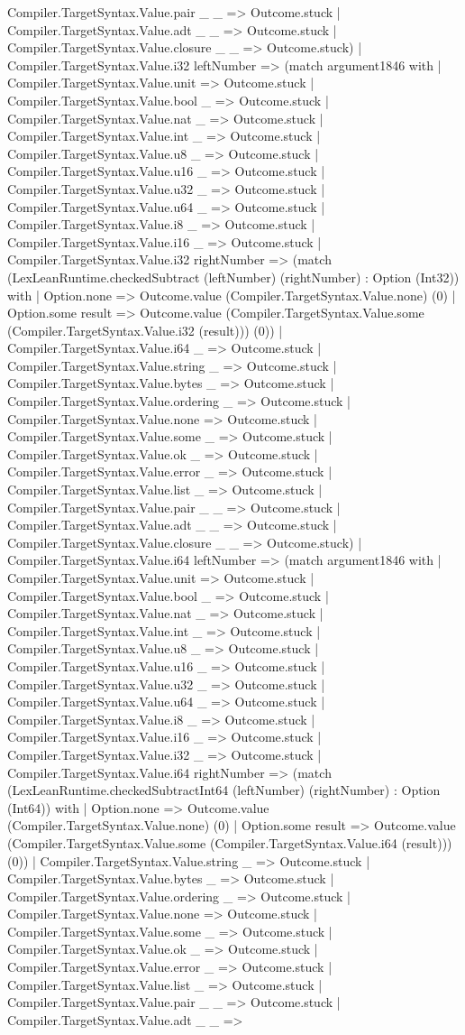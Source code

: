 \documentclass[11pt]{article}
\begin{document}
Compiler.TargetSyntax.Value.pair \_ \_ => Outcome.stuck | Compiler.TargetSyntax.Value.adt \_ \_ => Outcome.stuck | Compiler.TargetSyntax.Value.closure \_ \_ => Outcome.stuck) | Compiler.TargetSyntax.Value.i32 leftNumber => (match argument1846 with | Compiler.TargetSyntax.Value.unit => Outcome.stuck | Compiler.TargetSyntax.Value.bool \_ => Outcome.stuck | Compiler.TargetSyntax.Value.nat \_ => Outcome.stuck | Compiler.TargetSyntax.Value.int \_ => Outcome.stuck | Compiler.TargetSyntax.Value.u8 \_ => Outcome.stuck | Compiler.TargetSyntax.Value.u16 \_ => Outcome.stuck | Compiler.TargetSyntax.Value.u32 \_ => Outcome.stuck | Compiler.TargetSyntax.Value.u64 \_ => Outcome.stuck | Compiler.TargetSyntax.Value.i8 \_ => Outcome.stuck | Compiler.TargetSyntax.Value.i16 \_ => Outcome.stuck | Compiler.TargetSyntax.Value.i32 rightNumber => (match (LexLeanRuntime.checkedSubtract (leftNumber) (rightNumber) : Option (Int32)) with | Option.none => Outcome.value (Compiler.TargetSyntax.Value.none) (0) | Option.some result => Outcome.value (Compiler.TargetSyntax.Value.some (Compiler.TargetSyntax.Value.i32 (result))) (0)) | Compiler.TargetSyntax.Value.i64 \_ => Outcome.stuck | Compiler.TargetSyntax.Value.string \_ => Outcome.stuck | Compiler.TargetSyntax.Value.bytes \_ => Outcome.stuck | Compiler.TargetSyntax.Value.ordering \_ => Outcome.stuck | Compiler.TargetSyntax.Value.none => Outcome.stuck | Compiler.TargetSyntax.Value.some \_ => Outcome.stuck | Compiler.TargetSyntax.Value.ok \_ => Outcome.stuck | Compiler.TargetSyntax.Value.error \_ => Outcome.stuck | Compiler.TargetSyntax.Value.list \_ => Outcome.stuck | Compiler.TargetSyntax.Value.pair \_ \_ => Outcome.stuck | Compiler.TargetSyntax.Value.adt \_ \_ => Outcome.stuck | Compiler.TargetSyntax.Value.closure \_ \_ => Outcome.stuck) | Compiler.TargetSyntax.Value.i64 leftNumber => (match argument1846 with | Compiler.TargetSyntax.Value.unit => Outcome.stuck | Compiler.TargetSyntax.Value.bool \_ => Outcome.stuck | Compiler.TargetSyntax.Value.nat \_ => Outcome.stuck | Compiler.TargetSyntax.Value.int \_ => Outcome.stuck | Compiler.TargetSyntax.Value.u8 \_ => Outcome.stuck | Compiler.TargetSyntax.Value.u16 \_ => Outcome.stuck | Compiler.TargetSyntax.Value.u32 \_ => Outcome.stuck | Compiler.TargetSyntax.Value.u64 \_ => Outcome.stuck | Compiler.TargetSyntax.Value.i8 \_ => Outcome.stuck | Compiler.TargetSyntax.Value.i16 \_ => Outcome.stuck | Compiler.TargetSyntax.Value.i32 \_ => Outcome.stuck | Compiler.TargetSyntax.Value.i64 rightNumber => (match (LexLeanRuntime.checkedSubtractInt64 (leftNumber) (rightNumber) : Option (Int64)) with | Option.none => Outcome.value (Compiler.TargetSyntax.Value.none) (0) | Option.some result => Outcome.value (Compiler.TargetSyntax.Value.some (Compiler.TargetSyntax.Value.i64 (result))) (0)) | Compiler.TargetSyntax.Value.string \_ => Outcome.stuck | Compiler.TargetSyntax.Value.bytes \_ => Outcome.stuck | Compiler.TargetSyntax.Value.ordering \_ => Outcome.stuck | Compiler.TargetSyntax.Value.none => Outcome.stuck | Compiler.TargetSyntax.Value.some \_ => Outcome.stuck | Compiler.TargetSyntax.Value.ok \_ => Outcome.stuck | Compiler.TargetSyntax.Value.error \_ => Outcome.stuck | Compiler.TargetSyntax.Value.list \_ => Outcome.stuck | Compiler.TargetSyntax.Value.pair \_ \_ => Outcome.stuck | Compiler.TargetSyntax.Value.adt \_ \_ => 
\end{document}
